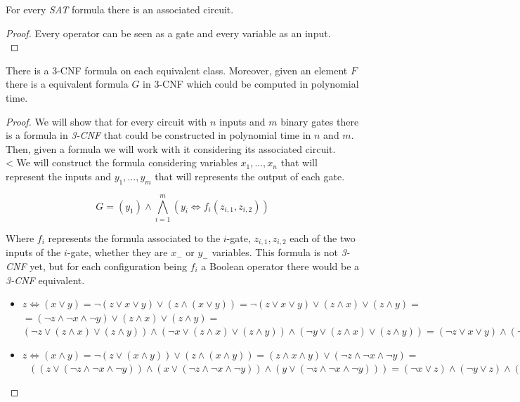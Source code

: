   \begin{lemma}
    For every \emph{SAT} formula there is an associated circuit.
  \end{lemma}
  \begin{proof}
    Every operator can be seen as a gate and every variable as an input.\\
  \end{proof}
  
  \begin{theorem} \label{the:Tseitin}
    There is a 3-CNF formula on each equivalent class. Moreover, given an element $F$  there is a equivalent formula $G$  in 3-CNF which could be computed in polynomial time. 
  \end{theorem}

  \begin{proof}
    We will show that for every circuit with $n$ inputs and $m$ binary gates there is a formula in \emph{3-CNF}  that could be constructed in polynomial time in $n$ and $m$. Then, given a formula we will work with it considering its associated circuit.\\
    <
    We will construct the formula considering variables $x_1,...,x_n$ that will represent the inputs and $y_1,...,y_m$ that will represents the output of each gate. 

    $$ G = (y_1) \wedge \bigwedge_{i=1}^m (y_i \iff f_i(z_{i,1},z_{i,2}))$$

    Where $f_i$ represents the formula associated to the $i$-gate, $z_{i,1},z_{i,2}$ each of the two inputs of the $i$-gate, whether they are $x_-$ or $y_-$ variables. This formula is not \emph{3-CNF} yet, but for each configuration being $f_i$ a Boolean operator there would be a \emph{3-CNF} equivalent.

    \begin{itemize}
    \item $z \iff( x \vee y )  = \neg  ( z \vee  x \vee y    ) \vee (z \wedge ( x \vee y )  ) = \neg  ( z \vee  x \vee y    ) \vee (z \wedge x)  \vee (z \wedge y ) =$\\$= ( \neg  z \wedge  \neg  x \wedge \neg   y    ) \vee (z \wedge x)  \vee (z \wedge y )  =$$
      (\neg  z \vee (z \wedge x)  \vee (z \wedge y ))  \wedge  
      (\neg  x \vee (z \wedge x)  \vee (z \wedge y )) \wedge
      (\neg  y \vee (z \wedge x)  \vee (z \wedge y ))   =
      (\neg  z \vee x  \vee y )  \wedge  
      (\neg  x \vee z  ) \wedge
      (\neg  y \vee z ) $   
    \item $z \iff( x \wedge y ) = \neg ( z \vee ( x \wedge y )) \vee (z \wedge ( x \wedge y )) = (z\wedge x \wedge y ) \vee  (\neg  z\wedge \neg  x \wedge \neg  y )  =$\\$\ \ \ ((z\vee  (\neg  z\wedge \neg  x \wedge \neg  y )  ) \wedge (x \vee  (\neg  z\wedge \neg  x \wedge \neg  y )  ) \wedge (y\vee  (\neg  z\wedge \neg  x \wedge \neg  y )  ) ) = (\neg  x \vee z) \wedge (\neg  y \vee z ) \wedge (\neg  z \vee x ) \wedge (\neg  y \vee x ) \wedge(\neg  z\vee y )\wedge (\neg  x\vee y )$
      

\end{itemize}
\end{proof}
